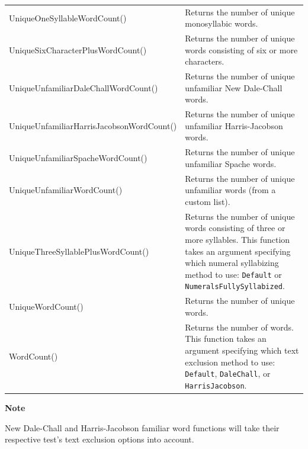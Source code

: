 \documentclass[
]{book}
\newenvironment{notesection}
    {
    \begin{tcolorbox}[colframe=mediumblue,colback=lightblue,coltext=mediumblue,arc=3mm]
    \faLightbulb[regular] \textbf{Note} \newline
    }
    {
    \end{tcolorbox}
    }
\theoremstyle{definition}
\theoremstyle{definition}
\theoremstyle{definition}
\theoremstyle{definition}
\theoremstyle{remark}
\begin{document}
\begin{longtable}[]{@{}
  >{\raggedright\arraybackslash}p{}
  >{\raggedright\arraybackslash}p{}@{}}
UniqueOneSyllableWordCount() & Returns the number of unique monosyllabic words. \\
UniqueSixCharacterPlusWordCount() & Returns the number of unique words consisting of six or more characters. \\
UniqueUnfamiliarDaleChallWordCount() & Returns the number of unique unfamiliar New Dale-Chall words. \\
UniqueUnfamiliarHarrisJacobsonWordCount() & Returns the number of unique unfamiliar Harris-Jacobson words. \\
UniqueUnfamiliarSpacheWordCount() & Returns the number of unique unfamiliar Spache words. \\
UniqueUnfamiliarWordCount() & Returns the number of unique unfamiliar words (from a custom list). \\
UniqueThreeSyllablePlusWordCount() & Returns the number of unique words consisting of three or more syllables. This function takes an argument specifying which numeral syllabizing method to use: \texttt{Default} or \texttt{NumeralsFullySyllabized}. \\
UniqueWordCount() & Returns the number of unique words. \\
WordCount() & Returns the number of words. This function takes an argument specifying which text exclusion method to use: \texttt{Default}, \texttt{DaleChall}, or \texttt{HarrisJacobson}. \\
\bottomrule
\end{longtable}

\begin{notesection}
New Dale-Chall and Harris-Jacobson familiar word functions will take their respective test's text exclusion options into account.

\end{notesection}
\end{document}
